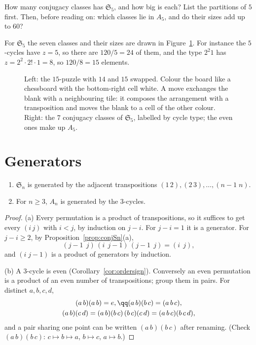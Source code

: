 \begin{think}
How many conjugacy classes has $\mathfrak S_5$, and how big is each? List the partitions of $5$ first. Then, before reading on: which classes lie in $A_5$, and do their sizes add up to $60$?
\end{think}

For $\mathfrak S_5$ the seven classes and their sizes are drawn in Figure~\ref{fig:fifteen}. For instance the $5$-cycles have $z=5$, so there are $120/5=24$ of them, and the type $2^2 1$ has $z=2^2\cdot2!\cdot1=8$, so $120/8=15$ elements.

\begin{figure}[ht]
\centering
{}
\caption{Left: the $15$-puzzle with $14$ and $15$ swapped. Colour the board like a chessboard with the bottom-right cell white. A move exchanges the blank with a neighbouring tile: it composes the arrangement with a transposition and moves the blank to a cell of the other colour. Right: the $7$ conjugacy classes of $\mathfrak S_5$, labelled by cycle type; the even ones make up $A_5$.}
\label{fig:fifteen}
\end{figure}

\section{Generators}

\begin{proposition}\label{prop:gens}
\begin{enumerate}[label=(\alph*)]
\item $\mathfrak S_n$ is generated by the adjacent transpositions $(1\,2),(2\,3),\dots,(n-1\;n)$.
\item For $n\ge3$, $A_n$ is generated by the $3$-cycles.
\end{enumerate}
\end{proposition}
\begin{proof}
(a) Every permutation is a product of transpositions, so it suffices to get every $(i\,j)$ with $i<j$, by induction on $j-i$. For $j-i=1$ it is a generator. For $j-i\ge2$, by Proposition~\ref{prop:conjSn}(a),
\[
(j-1\;\,j)\,(i\;\,j-1)\,(j-1\;\,j)=(i\;\,j),
\]
and $(i\;j-1)$ is a product of generators by induction.

(b) A $3$-cycle is even (Corollary~\ref{cor:ordersign}). Conversely an even permutation is a product of an even number of transpositions; group them in pairs. For distinct $a,b,c,d$,
\[
\begin{gathered}
(a\,b)(a\,b)=e,\qq(a\,b)(b\,c)=(a\,b\,c),\\
(a\,b)(c\,d)=(a\,b)(b\,c)\,(b\,c)(c\,d)=(a\,b\,c)(b\,c\,d),
\end{gathered}
\]
and a pair sharing one point can be written $(a\,b)(b\,c)$ after renaming. (Check $(a\,b)(b\,c)$: $c\mapsto b\mapsto a$, $b\mapsto c$, $a\mapsto b$.)
\end{proof}

